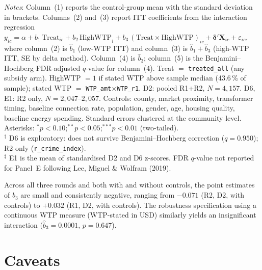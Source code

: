 \documentclass[12pt]{article}
\begin{document}
\begin{singlespace}
\begin{table}[H]
\begin{tabu}
\bottomrule
\end{tabu}
\vspace{0.4em}
\begin{minipage}{\linewidth}
\footnotesize
\textit{Notes}: Column~(1) reports the control-group mean with the
standard deviation in brackets. Columns~(2) and~(3) report ITT
coefficients from the interaction regression
$y_{ic} = \alpha + b_1\,\text{Treat}_{ic}
+ b_2\,\text{HighWTP}_{i}
+ b_3\,(\text{Treat}\times\text{HighWTP})_{ic}
+ \boldsymbol{\delta}'\mathbf{X}_{ic} + \varepsilon_{ic}$,
where column~(2) is $\hat{b}_1$ (low-WTP ITT) and column~(3) is
$\hat{b}_1+\hat{b}_3$ (high-WTP ITT, SE by delta method).
Column~(4) is $\hat{b}_3$; column~(5) is the Benjamini--Hochberg
FDR-adjusted $q$-value for column~(4).
Treat $=$ \texttt{treated\_all} (any subsidy arm).
HighWTP $= 1$ if stated WTP above sample median (43.6\,\% of sample);
stated WTP $=$ \texttt{WTP\_amt}$\times$\texttt{WTP\_r1}.
D2: pooled R1+R2, $N=4{,}157$. D6, E1: R2 only,
$N=2{,}047$--$2{,}057$.
Controls: county, market proximity, transformer timing, baseline
connection rate, population, gender, age, housing quality, baseline
energy spending. Standard errors clustered at the community level.
Asterisks: $^{*}p<0.10$;\;$^{**}p<0.05$;\;$^{***}p<0.01$ (two-tailed).\\[2pt]
$^\dagger$ D6 is exploratory: does not survive Benjamini--Hochberg
correction ($q=0.950$); R2 only (\texttt{r\_crime\_index}).\\[2pt]
$^\ddagger$ E1 is the mean of standardised D2 and D6 z-scores.
FDR $q$-value not reported for Panel~E following Lee, Miguel \&
Wolfram (2019).
\end{minipage}
\end{table}

\end{singlespace}
\restoregeometry

Across all three rounds and both with and without controls, the point
estimates of $b_3$ are small and consistently negative, ranging from
$-0.071$ (R2, D2, with controls) to $+0.032$ (R1, D2, with controls).
The robustness specification using a continuous WTP measure (WTP-stated
in USD) similarly yields an insignificant interaction
($\hat{b}_3=0.0001$, $p=0.647$).

\section{Caveats}
\label{sec:caveats}
\end{document}

